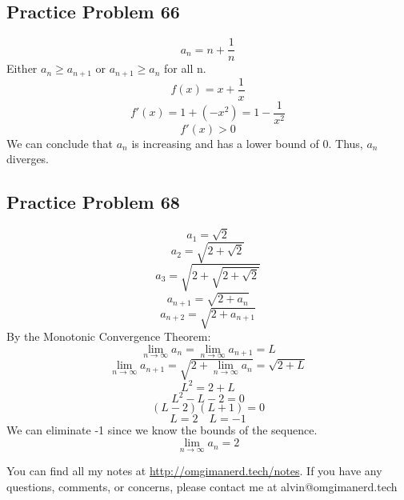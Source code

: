 \documentclass[letterpaper, 12pt]{math}
\begin{document}
\subsection*{Practice Problem 66}
\[ a_{n} = n+\frac{1}{n} \]
Either \( a_{n} \geq a_{n+1} \) or \( a_{n+1} \geq a_{n} \) for all n.
\[ f(x) = x+\frac{1}{x} \]
\[ f'(x) = 1+(-x^{2}) = 1-\frac{1}{x^{2}} \]
\[ f'(x) > 0 \]
We can conclude that \( a_{n} \) is increasing and has a lower bound of 0.
Thus, \( a_{n} \) diverges.

\subsection*{Practice Problem 68}
\[ a_{1} = \sqrt{2} \]
\[ a_{2} = \sqrt{2+\sqrt{2}} \]
\[ a_{3} = \sqrt{2+\sqrt{2+\sqrt{2}}} \]
\[ a_{n+1} = \sqrt{2+a_{n}} \]
\[ a_{n+2} = \sqrt{2+a_{n+1}} \]
By the Monotonic Convergence Theorem:
\[ \lim_{n\to\infty}{a_{n}} = \lim_{n\to\infty}{a_{n+1}} = L \]
\[ \lim_{n\to\infty}{a_{n+1}} = \sqrt{2+\lim_{n\to\infty}{a_{n}}} =
   \sqrt{2+L} \]
\[ L^{2} = 2+L \]
\[ L^{2}-L-2 = 0 \]
\[ (L-2)(L+1) = 0 \]
\[ L = 2 \quad L = -1 \]
We can eliminate -1 since we know the bounds of the sequence.
\[ \lim_{n\to\infty}{a_{n}} = 2 \]

\begin{center}
  You can find all my notes at \url{http://omgimanerd.tech/notes}. If you have
  any questions, comments, or concerns, please contact me at
  alvin@omgimanerd.tech
\end{center}
\end{document}
